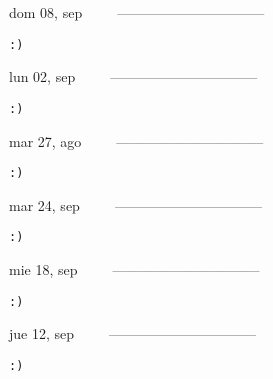 \documentclass[letterpaper,10pt]{article}
\begin{document}
\begin{multicols}{3}
{dom 08, sep\ \ \ \ \ --------------------------------}
\begin{flushright}\begin{small}\texttt{:)}\end{small}\end{flushright}
\vfill
{lun 02, sep\ \ \ \ \ --------------------------------}
\begin{flushright}\begin{small}\texttt{:)}\end{small}\end{flushright}\par
\vfill
{mar 27, ago\ \ \ \ \ --------------------------------}
\begin{flushright}\begin{small}\texttt{:)}\end{small}\end{flushright}\par
\vfill
\end{multicols}
\vspace{1.05cm}

\begin{multicols}{3}
{mar 24, sep\ \ \ \ \ --------------------------------}
\begin{flushright}\begin{small}\texttt{:)}\end{small}\end{flushright}
\vfill
{mie 18, sep\ \ \ \ \ --------------------------------}
\begin{flushright}\begin{small}\texttt{:)}\end{small}\end{flushright}\par
\vfill
{jue 12, sep\ \ \ \ \ --------------------------------}
\begin{flushright}\begin{small}\texttt{:)}\end{small}\end{flushright}\par
\vfill
\end{multicols}
\vspace{1.05cm}
\end{document}
